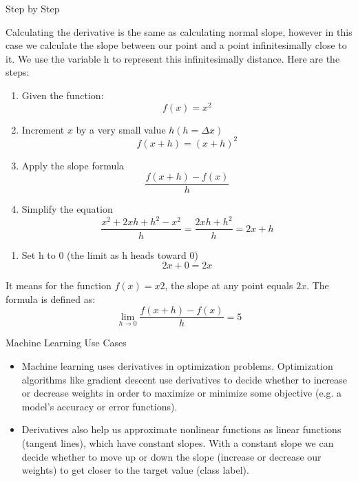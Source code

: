\documentclass{beamer}
\begin{document}
\begin{frame}{Step by Step}
	\begin{flushleft}
		Calculating the derivative is the same as calculating normal slope, however in this case we calculate the slope between our point and a point infinitesimally close to it. We use the variable h to represent this infinitesimally distance. Here are the steps:
	\end{flushleft}
		\begin{enumerate}
			\item Given the function:
				\begin{equation*}
					f(x) = x^2
				\end{equation*}
			\item Increment $x$ by a very small value $h(h=Δx)$
				\begin{equation*}
					f(x+h) = (x+h)^2
				\end{equation*}
			\item Apply the slope formula
				\begin{equation*}
					\frac{f(x + h) - f(x)}{h}
				\end{equation*}
			\item Simplify the equation
				\begin{equation*}
					\frac{x^2 + 2xh + h^2 - x^2}{h} = 
					\frac{2xh + h^2}{h} = 2x + h
				\end{equation*}
		\end{enumerate}
	\end{frame}
\begin{frame}
	\begin{enumerate}
		\item Set h to 0 (the limit as h heads toward 0)
			\begin{equation*}
				2x + 0 = 2x
			\end{equation*}
	\end{enumerate}
	\begin{flushleft}
		It means for the function $f(x)=x2$, the slope at any point equals $2x$. The formula is defined as:
		\begin{equation*}
			\lim_{h \to 0} \frac{f(x + h) - f(x)}{h} = 5
		\end{equation*}
	\end{flushleft}
\end{frame}

\begin{frame}{Machine Learning Use Cases}
\begin{itemize}
    \item Machine learning uses derivatives in optimization problems. Optimization algorithms like gradient descent use derivatives to decide whether to increase or decrease weights in order to maximize or minimize some objective (e.g. a model’s accuracy or error functions). 
    \item Derivatives also help us approximate nonlinear functions as linear functions (tangent lines), which have constant slopes. With a constant slope we can decide whether to move up or down the slope (increase or decrease our weights) to get closer to the target value (class label).
\end{itemize}
\end{frame}
\end{document}
